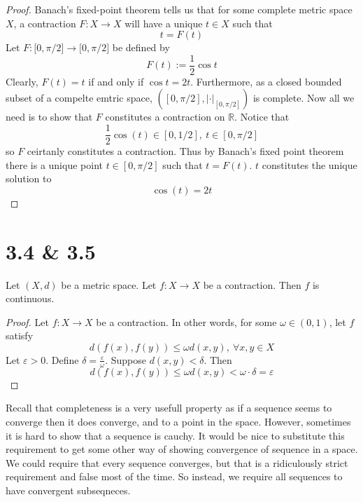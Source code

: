 \begin{proof}
    Banach's fixed-point theorem tells us that for some complete 
    metric space $X$, a contraction $F:X\to X$ will have a unique 
    $t \in X$ such that 
    \[
        t = F(t)
    \]
    Let $F: \mathbb [0,\pi/2] \to \mathbb [0,\pi/2]$ be defined by 
    \[
        F(t) := \frac{1}{2}\cos t
    \]
    Clearly, $F(t) = t$ if and only if $\cos t = 2t$. 
    Furthermore, as a closed bounded subset of a compelte emtric  
    space,  $([0,\pi/2], |\cdot|_{[0,\pi/2]})$ is complete.  
    Now all we need is to show that 
    $F$ constitutes a contraction on $\mathbb R$. 
    Notice that 
    \[
        \frac{1}{2}\cos(t) \in [0,1/2], \: t \in [0,\pi/2]
    \]
    so $F$ ceirtanly constitutes a contraction. Thus 
    by Banach's fixed point theorem there is a unique 
    point $t \in [0,\pi/2]$ such that $t = F(t)$. $t$ constitutes 
    the unique solution to 
    \[
        \cos(t) = 2t
    \]
\end{proof}

\newpage 
\section{3.4 \& 3.5}
\begin{prop}
    Let $(X,d)$ be a metric space. Let $f : X \to X$ be 
    a contraction. Then $f$ is continuous.
\end{prop}
\begin{proof}
    Let $f : X \to X$ be a contraction. In other words, for 
    some $\omega \in (0,1)$, let 
    $f$ satisfy  
    \[
        d(f(x), f(y)) \leq \omega d(x,y), \: \forall x,y \in X
    \]
    Let $\varepsilon > 0$. 
    Define $\delta = \frac{\varepsilon}{\omega}$.
    Suppose $d(x,y) < \delta$. Then 
    \[
        d(f(x),f(y)) \leq \omega d(x,y) < \omega \cdot \delta 
        = \varepsilon
    \]
\end{proof}

Recall that completeness is a very usefull property as if a 
sequence seems to converge then it does converge, and to a 
point in the space. However, sometimes it is hard to 
show that a sequence is cauchy. 
It would be nice to substitute this requirement to get 
some other way of showing convergence of sequence in a space. 
We could require that every sequence converges, but that 
is a ridiculously strict requirement and false most of the time. 
So instead, we require all sequences to have convergent subseqneces. 

